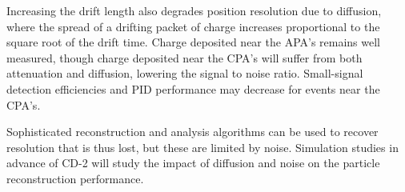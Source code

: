 Increasing the drift length also degrades position resolution due to diffusion, where the
spread of a drifting packet of charge increases proportional to the square root of the
drift time.  Charge deposited near the APA's remains well measured, though charge deposited
near the CPA's will suffer from both attenuation and diffusion, lowering the signal to noise
ratio.  Small-signal detection efficiencies and PID performance may decrease for events
near the CPA's.

Sophisticated reconstruction and analysis algorithms can be used to recover resolution that
is thus lost, but these are limited by noise.  Simulation studies in advance of CD-2 will
study the impact of diffusion and noise on the particle reconstruction performance.
